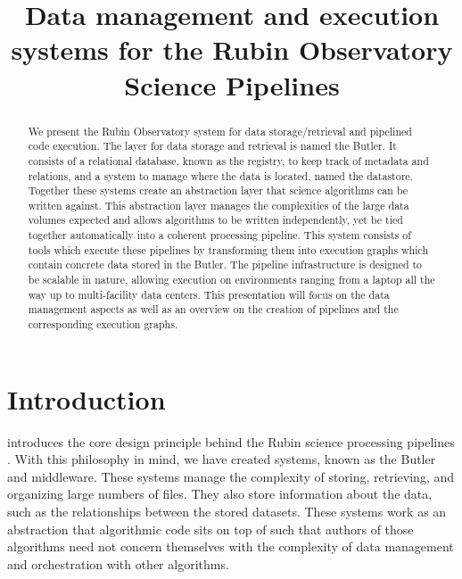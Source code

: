 \documentclass[11pt,twoside]{article}
\begin{document}




\title{Data management and execution systems for the Rubin Observatory Science Pipelines}


\begin{abstract}
    We present the Rubin Observatory system for data storage/retrieval and pipelined code execution. The layer for data storage and retrieval is named the Butler. It consists of a relational database, known as the registry, to keep track of metadata and relations, and a system to manage where the data is located, named the datastore. Together these systems create an abstraction layer that science algorithms can be written against. This abstraction layer manages the complexities of the large data volumes expected and allows algorithms to be written independently, yet be tied together automatically into a coherent processing pipeline. This system consists of tools which execute these pipelines by transforming them into execution graphs which contain concrete data stored in the Butler. The pipeline infrastructure is designed to be scalable in nature, allowing execution on environments ranging from a laptop all the way up to multi-facility data centers. This presentation will focus on the data management aspects as well as an overview on the creation of pipelines and the corresponding execution graphs.
\end{abstract}

\section{Introduction}

\citet{I08_adassxxxii} introduces the core design principle behind the Rubin science processing pipelines \citep{2019ApJ...873..111I}. With this philosophy in mind, we have created systems, known as the Butler and middleware. These systems manage the complexity of storing, retrieving, and organizing large numbers of files. They also store information about the data, such as the relationships between the stored datasets. These systems work as an abstraction that algorithmic code sits on top of such that authors of those algorithms need not concern themselves with the complexity of data management and orchestration with other algorithms.
\end{document}

